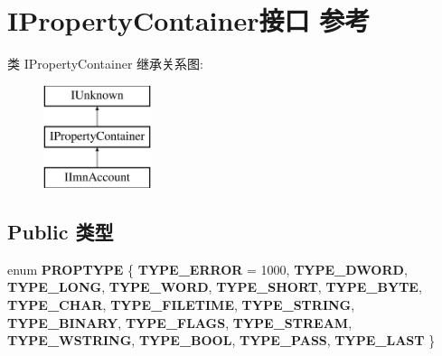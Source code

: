 \hypertarget{interface_i_property_container}{}\section{I\+Property\+Container接口 参考}
\label{interface_i_property_container}
类 I\+Property\+Container 继承关系图\+:\begin{figure}[H]
\begin{center}
\leavevmode
\includegraphics[height=3.000000cm]{interface_i_property_container}
\end{center}
\end{figure}
\subsection*{Public 类型}
\begin{DoxyCompactItemize}
\item 
\mbox{\label{interface_i_property_container_a8599390cbe4cb11f95094b8e1eb94ee5}} 
enum {\bfseries P\+R\+O\+P\+T\+Y\+PE} \{ \newline
{\bfseries T\+Y\+P\+E\+\_\+\+E\+R\+R\+OR} = 1000, 
{\bfseries T\+Y\+P\+E\+\_\+\+D\+W\+O\+RD}, 
{\bfseries T\+Y\+P\+E\+\_\+\+L\+O\+NG}, 
{\bfseries T\+Y\+P\+E\+\_\+\+W\+O\+RD}, 
\newline
{\bfseries T\+Y\+P\+E\+\_\+\+S\+H\+O\+RT}, 
{\bfseries T\+Y\+P\+E\+\_\+\+B\+Y\+TE}, 
{\bfseries T\+Y\+P\+E\+\_\+\+C\+H\+AR}, 
{\bfseries T\+Y\+P\+E\+\_\+\+F\+I\+L\+E\+T\+I\+ME}, 
\newline
{\bfseries T\+Y\+P\+E\+\_\+\+S\+T\+R\+I\+NG}, 
{\bfseries T\+Y\+P\+E\+\_\+\+B\+I\+N\+A\+RY}, 
{\bfseries T\+Y\+P\+E\+\_\+\+F\+L\+A\+GS}, 
{\bfseries T\+Y\+P\+E\+\_\+\+S\+T\+R\+E\+AM}, 
\newline
{\bfseries T\+Y\+P\+E\+\_\+\+W\+S\+T\+R\+I\+NG}, 
{\bfseries T\+Y\+P\+E\+\_\+\+B\+O\+OL}, 
{\bfseries T\+Y\+P\+E\+\_\+\+P\+A\+SS}, 
{\bfseries T\+Y\+P\+E\+\_\+\+L\+A\+ST}
 \}
\end{DoxyCompactItemize}
